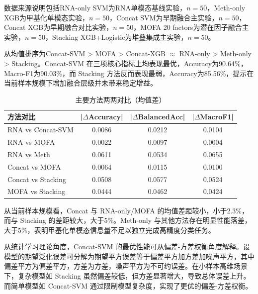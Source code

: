 数据来源说明包括RNA-only SVM为RNA单模态基线实验，$n=50$，Meth-only XGB为甲基化单模态实验，$n=50$，Concat SVM为早期融合主实验，$n=50$，Concat XGB为早期融合对比实验，$n=50$，MOFA 20 factors为潜在因子融合主实验，$n=50$，Stacking XGB+Logistic为堆叠集成主实验，$n=50$。

从均值排序为Concat-SVM > MOFA > Concat-XGB $\approx$ RNA-only > Meth-only > Stacking。Concat-SVM 在三项核心指标上均表现最优，Accuracy为90.64\%，Macro-F1为90.03\%，而 Stacking 方法反而表现最弱，Accuracy为85.56\%，提示在当前样本规模下增加融合层级并未带来稳定增益。

\begin{table}[H]
\centering
\caption{主要方法两两对比（均值差）}
\label{tab:permtest-all}
\begin{tabular}{lccc}
\toprule
方法对比 & |$\Delta$Accuracy| & |$\Delta$BalancedAcc| & |$\Delta$MacroF1| \\
\midrule
RNA vs Concat-SVM & 0.0086 & 0.0212 & 0.0104 \\
RNA vs MOFA & 0.0022 & 0.0097 & 0.0004 \\
RNA vs Meth & 0.0611 & 0.0534 & 0.0655 \\
Concat vs MOFA & 0.0064 & 0.0115 & 0.0100 \\
Concat vs Stacking & 0.0508 & 0.0577 & 0.0524 \\
MOFA vs Stacking & 0.0444 & 0.0462 & 0.0424 \\
\bottomrule
\end{tabular}
\end{table}

从当前样本规模看，Concat 与 RNA-only/MOFA 的均值差距较小，小于2.3\%，而与 Stacking 的差距较大，大于5\%。Meth-only 与其他方法存在明显性能落差，大于5\%，表明甲基化单模态信息量不足以独立完成高精度分类任务。

从统计学习理论角度，Concat-SVM 的最优性能可从偏差-方差权衡角度解释。设模型的期望泛化误差可分解为期望平方误差等于偏差平方加方差加噪声平方，其中偏差平方为偏差平方，方差为方差，噪声平方为不可约误差。在小样本高维场景下，复杂模型如 Stacking 虽然偏差较低，但方差显著增大，导致总体误差上升。而简单模型如 Concat-SVM 通过限制模型复杂度，实现了更优的偏差-方差权衡。

